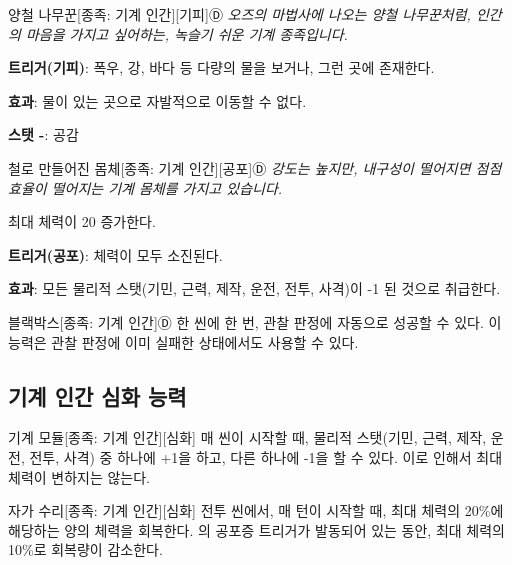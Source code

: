 \documentclass{report}
\begin{document}
	\begin{story}{양철 나무꾼}{[종족: 기계 인간][기피]Ⓓ}
		\textit{오즈의 마법사에 나오는 양철 나무꾼처럼, 인간의 마음을 가지고 싶어하는, 녹슬기 쉬운 기계 종족입니다.}
		
		\textbf{트리거(기피)}: 폭우, 강, 바다 등 다량의 물을 보거나, 그런 곳에 존재한다.
		
		\textbf{효과}: 물이 있는 곳으로 자발적으로 이동할 수 없다.
		
		\smallskip
		
		\textbf{스탯 -}: 공감
		
	\end{story}
	
	\begin{story}{철로 만들어진 몸체}{[종족: 기계 인간][공포]Ⓓ}
		\textit{강도는 높지만, 내구성이 떨어지면 점점 효율이 떨어지는 기계 몸체를 가지고 있습니다.}
		
		\smallskip
		
		최대 체력이 20 증가한다.
		
		\smallskip
		
		\textbf{트리거(공포)}: 체력이 모두 소진된다.
		
		\textbf{효과}: 모든 물리적 스탯(기민, 근력, 제작, 운전, 전투, 사격)이 -1 된 것으로 취급한다.
		
	\end{story}
	
	\begin{story}{블랙박스}{[종족: 기계 인간]Ⓓ}
		한 씬에 한 번, 관찰 판정에 자동으로 성공할 수 있다. 이 능력은 관찰 판정에 이미 실패한 상태에서도 사용할 수 있다.
		
	\end{story}
	
	\subsection{기계 인간 심화 능력}
		\begin{story}{기계 모듈}{[종족: 기계 인간][심화]}
			매 씬이 시작할 때, 물리적 스탯(기민, 근력, 제작, 운전, 전투, 사격) 중 하나에 +1을 하고, 다른 하나에 -1을 할 수 있다. 이로 인해서 최대 체력이 변하지는 않는다.
			
		\end{story}
		
		\begin{story}{자가 수리}{[종족: 기계 인간][심화]}
			전투 씬에서, 매 턴이 시작할 때, 최대 체력의 20\%에 해당하는 양의 체력을 회복한다. 의 공포증 트리거가 발동되어 있는 동안, 최대 체력의 10\%로 회복량이 감소한다.
			
		\end{story}
\end{document}
